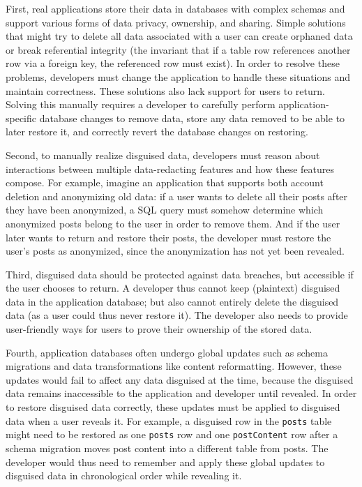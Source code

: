 %
First, real applications store their data in databases with complex schemas and
support various forms of data privacy, ownership, and sharing.
%
Simple solutions that might try to delete all data associated with a user can
create orphaned data or break referential integrity (the invariant that if a
table row references another row via a foreign key, the referenced row must
exist). 
%
In order to resolve these problems, developers must change the application to
handle these situations and maintain correctness. These solutions also lack
support for users to return.
%
Solving this manually requires a developer to carefully perform
application-specific database changes to remove data, store any data removed to
be able to later restore it, and correctly revert the database changes on
restoring.
%

%
Second, to manually realize disguised data, developers must reason about
interactions between multiple data-redacting features and how these features
compose.
%
For example, imagine an application that supports both account deletion and
anonymizing old data: if a user wants to delete all their posts after they have
been anonymized, a SQL query must somehow determine which anonymized posts
belong to the user in order to remove them.
%
And if the user later wants to return and restore their posts, the developer
must restore the user's posts as anonymized, since the anonymization has not yet
been revealed.
%

%
Third, disguised data should be protected against data breaches, but accessible
if the user chooses to return. A developer thus cannot keep (plaintext)
disguised data in the application database; but also cannot entirely delete the
disguised data (as a user could thus never restore it). The developer also needs
to provide user-friendly ways for users to prove their ownership of the stored
data.
%

%
Fourth, application databases often undergo global updates such as schema
migrations and data transformations like content reformatting. However, these
updates would fail to affect any data disguised at the time, because the
disguised data remains inaccessible to the application and developer until
revealed.  In order to restore disguised data correctly, these updates must be
applied to disguised data when a user reveals it.
%
For example, a disguised row in the \texttt{posts} table might need to be
restored as one \texttt{posts} row and one \texttt{postContent} row after a schema
migration moves post content into a different table from posts. 
%
The developer would thus need to remember and apply these global updates to disguised
data in chronological order while revealing it.
%


